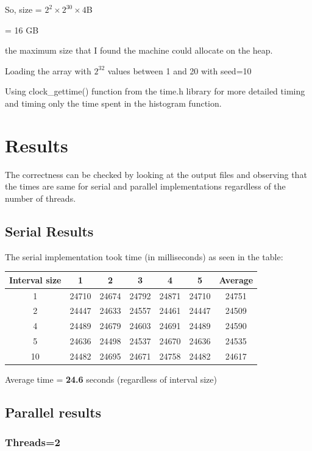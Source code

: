 \documentclass[12pt,letterpaper]{article}
\begin{document}
So, size = $2^2 \times 2^{30} \times 4$B

= 16 GB

the maximum size that I found the machine could allocate on the heap.

Loading the array with $2^{32}$ values between 1 and 20 with seed=10

Using clock\_gettime() function from the time.h library for more detailed timing and timing only the time spent in the histogram function.

\section{Results}
The correctness can be checked by looking at the output files and observing that the times are same for serial and parallel implementations regardless of the number of threads.

\subsection{Serial Results}

The serial implementation took time (in milliseconds) as seen in the table:

\begin{center}
\begin{tabular}{c c c c c c c}
\hline
Interval size	&	1		&	2		&	3		&	4		&	5 		& Average	\\
\hline
1				&	24710	&	24674	& 	24792	&	24871	&	24710 	&	24751 \\
2				&	24447	&	24633	&	24557	&	24461	&	24447 	&	24509 \\
4				&	24489	&	24679	&	24603	&	24691	& 	24489 	&	24590 \\
5				&	24636	&	24498	&	24537	&	24670	&	24636 	&	24535 \\
10				&	24482	&	24695	&	24671	&	24758	&	24482 	&	24617 \\
\hline
\end{tabular}
\end{center}

Average time = \textbf{24.6} seconds (regardless of interval size)

\subsection{Parallel results}

\subsubsection{Threads=2}
\end{document}

